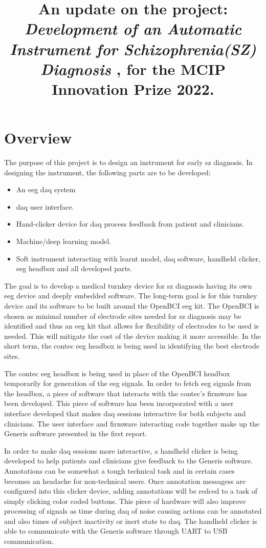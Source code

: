 \documentclass[10pt]{article}
\title{
  An update on the project: 
  \textbf{
      \textit{
        Development of an Automatic Instrument for Schizophrenia(SZ) Diagnosis
        }
      }, for the MCIP Innovation Prize 2022.
  }
\begin{document}
\maketitle

\section{Overview}
The purpose of this project is to design an instrument for early \gls{sz} diagnosis.
In designing the instrument, the following parts are to be developed:
\begin{itemize}
  \item An \gls{eeg} \gls{daq} system
  \item \gls{daq} user interface.
  \item Hand-clicker device for \gls{daq} process feedback from patient and clinicians.
  \item Machine/deep learning model.
  \item Soft instrument interacting with learnt model, \gls{daq} software, handheld 
  clicker, \gls{eeg} headbox and all developed parts.
  
\end{itemize}
The goal is to develop a medical turnkey device for \gls{sz} diagnosis having its own 
\gls{eeg} device and deeply embedded software. The long-term goal is for this turnkey device 
and its software to be built around the OpenBCI \gls{eeg} kit. The OpenBCI is chosen as
minimal number of electrode sites needed for \gls{sz} diagnosis may be identified and thus 
an \gls{eeg} kit that allows for flexibility of electrodes to be used is needed. This will 
mitigate the cost of the device making it more accessible. In the short term, the contec 
\gls{eeg} headbox is being used in identifying the best electrode sites.

The contec \gls{eeg} headbox is being used in place of the OpenBCI headbox temporarily 
for generation of the \gls{eeg} signals.
In order to fetch \gls{eeg} signals from the headbox, a piece of software that interacts 
with the contec's firmware has been developed. This piece of software has been incorporated 
with a user interface developed that makes \gls{daq} sessions interactive for both 
subjects and clinicians. The user interface and firmware interacting code together make 
up the Generis software presented in the first report.

In order to make \gls{daq} sessions more interactive, a handheld clicker is being developed 
to help patients and clinicians give feedback to the Generis software. Annotations can be 
somewhat a tough technical task and in certain cases becomes an headache for non-technical 
users. Once annotation messagess are configured into this clicker device, adding annotations 
will be redced to a task of simply clicking color coded buttons. This piece of hardware 
will also improve processing of signals as time during \gls{daq} of noise causing actions can be 
annotated and also times of subject inactivity or inert state to \gls{daq}. The handheld clicker 
is able to communicate with the Generis software through UART to USB communication.
\end{document}
